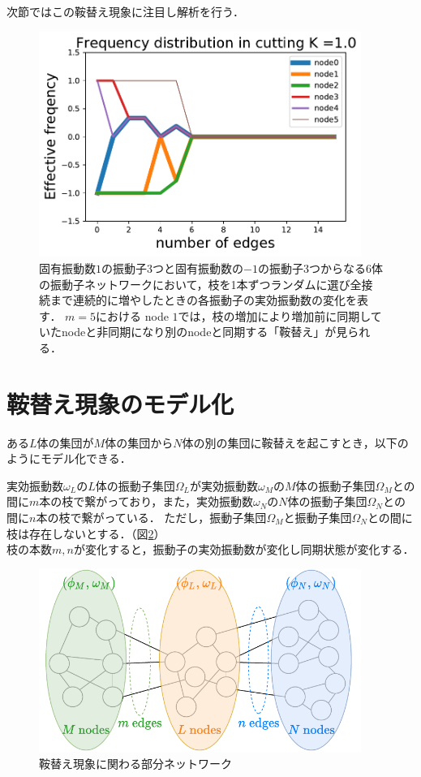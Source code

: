 \documentclass[../main]{subfiles}
\begin{document}
次節ではこの鞍替え現象に注目し解析を行う．

\begin{figure}[tbp]
\centering
\includegraphics[width=105mm]{./images/cutting_N6K10.pdf}
\centering
\caption{固有振動数$1$の振動子3つと固有振動数の$-1$の振動子3つからなる6体の振動子ネットワークにおいて，枝を1本ずつランダムに選び全接続まで連続的に増やしたときの各振動子の実効振動数の変化を表す．
$m=5$における node $1$では，枝の増加により増加前に同期していたnodeと非同期になり別のnodeと同期する「鞍替え」が見られる．}
\label{fig:cutting_N6K1}
\end{figure}

\section{鞍替え現象のモデル化}
ある$L$体の集団が$M$体の集団から$N$体の別の集団に鞍替えを起こすとき，以下のようにモデル化できる．
\begin{screen}
実効振動数$\omega_L$の$L$体の振動子集団$\Omega_L$が実効振動数$\omega_M$の$M$体の振動子集団$\Omega_M$との間に$m$本の枝で繋がっており，また，実効振動数$\omega_N$の$N$体の振動子集団$\Omega_N$との間に$n$本の枝で繋がっている．
ただし，振動子集団$\Omega_M$と振動子集団$\Omega_N$との間に枝は存在しないとする．（図\ref{fig:switch}）\\
枝の本数$m,n$が変化すると，振動子の実効振動数が変化し同期状態が変化する．
\end{screen}

\begin{figure}[tbp]
\centering
\includegraphics[width=105mm]{./images/three_obj_before.pdf}
\centering
\caption{鞍替え現象に関わる部分ネットワーク}
\label{fig:switch}
\end{figure}
\end{document}
